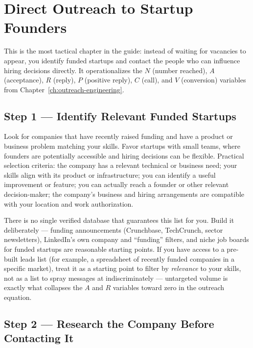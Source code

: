 \chapter{Direct Outreach to Startup Founders}
\label{ch:direct-outreach}

This is the most tactical chapter in the guide: instead of waiting for vacancies to appear, you identify funded
startups and contact the people who can influence hiring decisions directly. It operationalizes the $N$ (number
reached), $A$ (acceptance), $R$ (reply), $P$ (positive reply), $C$ (call), and $V$ (conversion) variables from
Chapter~\ref{ch:outreach-engineering}.

\section{Step 1 --- Identify Relevant Funded Startups}

Look for companies that have recently raised funding and have a product or business problem matching your
skills. Favor startups with small teams, where founders are potentially accessible and hiring decisions can be
flexible. Practical selection criteria: the company has a relevant technical or business need; your skills align
with its product or infrastructure; you can identify a useful improvement or feature; you can actually reach a
founder or other relevant decision-maker; the company's business and hiring arrangements are compatible with your
location and work authorization.

\begin{caution}
There is no single verified database that guarantees this list for you. Build it deliberately --- funding
announcements (Crunchbase, TechCrunch, sector newsletters), LinkedIn's own company and ``funding'' filters, and
niche job boards for funded startups are reasonable starting points. If you have access to a pre-built leads list
(for example, a spreadsheet of recently funded companies in a specific market), treat it as a starting point to
filter by \emph{relevance} to your skills, not as a list to spray messages at indiscriminately --- untargeted
volume is exactly what collapses the $A$ and $R$ variables toward zero in the outreach equation.
\end{caution}

\section{Step 2 --- Research the Company Before Contacting It}

